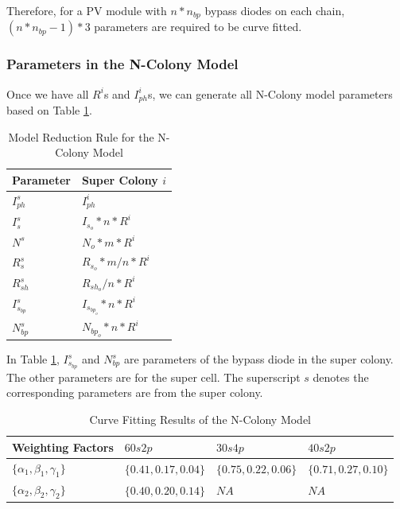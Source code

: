 Therefore, for a PV module with $n*n_{bp}$ bypass diodes on each chain, $(n*n_{bp} - 1)*3$ parameters are required to be curve fitted.


\subsubsection{Parameters in the N-Colony Model}
Once we have all $R^i$s and $I_{ph}^i$s, we can generate all N-Colony model parameters based on Table \ref{table:ncRule}.
\begin{table}[tb]
  \caption{Model Reduction Rule for the N-Colony Model }
  \label{table:ncRule}
  \centering
  \normalsize
\begin{tabular}{|l|l|}
  \hline
  Parameter & Super Colony $i$ \\
  \hline
  $I_{ph}^s$ & $I_{ph}^i$ \\
  \hline
  $I_s^s$ & $I_{s_o}*n*R^i $\\
  \hline
  $N^s$ & $N_o*m*R^i $\\
  \hline
  $R_s^s$ & $R_{s_o}*m/n*R^i$ \\
  \hline
  $R_{sh}^s$ & $R_{sh_o}/n*R^i$  \\
  \hline
  $I_{s_{bp}}^s$ & $I_{s_{bp_o}}*n*R^i$  \\
  \hline
  $N_{bp}^s$ & $N_{bp_o}*n*R^i$  \\
  \hline
\end{tabular}
\end{table}
In Table \ref{table:ncRule}, $I_{s_{bp}}^s$ and $N_{bp}^s$ are parameters of the bypass diode in the super colony. The other parameters are for the super cell. The superscript $s$ denotes the corresponding parameters are from the super colony.

\begin{table}[tb]
  \caption{Curve Fitting Results of the N-Colony Model}
  \label{table:ncCurveFit}
  \centering
  \normalsize
\begin{tabular}{|l|l|l|l|}
  \hline
  Weighting Factors & $60s2p$ & $30s4p$ & $40s2p$\\
  \hline
  $\{\alpha_1, \beta_1, \gamma_1\}$ &$\{0.41, 0.17, 0.04\} $ & $\{0.75, 0.22, 0.06\} $ & $\{0.71, 0.27, 0.10\}$ \\
  \hline
  $\{\alpha_2, \beta_2, \gamma_2\}$ &$\{0.40, 0.20, 0.14\} $ & $NA $ & $NA$ \\
  \hline
\end{tabular}
\end{table}



